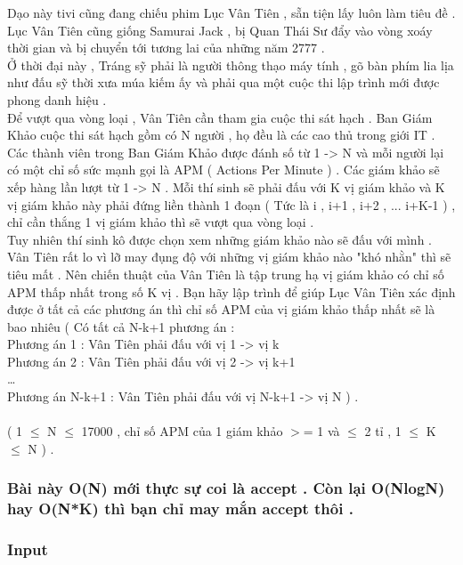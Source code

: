 



   Dạo này tivi cũng đang chiếu phim Lục Vân Tiên , sẵn tiện lấy luôn làm tiêu đề .   
\\   Lục Vân Tiên cũng giống Samurai Jack , bị Quan Thái Sư đẩy vào vòng xoáy thời gian và bị chuyển tới tương lai của những năm 2777 .   
\\   Ở thời đại này , Tráng sỹ phải là người thông thạo máy tính , gõ bàn phím lia lịa như đấu sỹ thời xưa múa kiếm ấy và phải qua một cuộc thi lập trình mới được phong danh hiệu .   
\\   Để vượt qua vòng loại , Vân Tiên cần tham gia cuộc thi sát hạch . Ban Giám Khảo cuộc thi sát hạch gồm có N người , họ đều là các cao thủ trong giới IT . Các thành viên trong Ban Giám Khảo được đánh số từ 1 -> N và mỗi người lại có một chỉ số sức mạnh gọi là APM ( Actions Per Minute ) . Các giám khảo sẽ xếp hàng lần lượt từ 1 -> N . Mỗi thí sinh sẽ phải đấu với K vị giám khảo và K vị giám khảo này phải đứng liền thành 1 đoạn ( Tức là i , i+1 , i+2 , ... i+K-1 ) , chỉ cần thắng 1 vị giám khảo thì sẽ vượt qua vòng loại .   
\\   Tuy nhiên thí sinh kô được chọn xem những giám khảo nào sẽ đấu với mình .   
\\   Vân Tiên rất lo vì lỡ may đụng độ với những vị giám khảo nào "khó nhằn" thì sẽ tiêu mất . Nên chiến thuật của Vân Tiên là tập trung hạ vị giám khảo có chỉ số APM thấp nhất trong số K vị . Bạn hãy lập trình để giúp Lục Vân Tiên xác định được ở tất cả các phương án thì chỉ số APM của vị giám khảo thấp nhất sẽ là bao nhiêu ( Có tất cả N-k+1 phương án :   
\\   Phương án 1 : Vân Tiên phải đấu với vị 1 -> vị k   
\\   Phương án 2 : Vân Tiên phải đấu với vị 2 -> vị k+1   
\\   …   
\\   Phương án N-k+1  : Vân Tiên phải đấu với vị N-k+1 -> vị N ) .   
\\
\\   ( 1  $\le$  N  $\le$  17000 , chỉ số APM của 1 giám khảo $>$= 1 và  $\le$  2 tỉ , 1  $\le$  K  $\le$  N ) .  

\subsubsection{   Bài này O(N) mới thực sự coi là accept . Còn lại O(NlogN) hay O(N*K) thì bạn chỉ may mắn accept thôi .  }

\subsubsection{   Input  }

